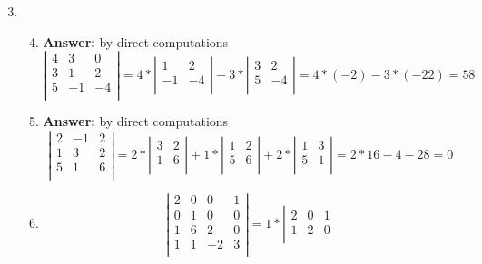 \documentclass[8pt]{article} %
\begin{document}
\begin{enumerate}[1]
	\setcounter{enumi}{2}
	\item \begin{enumerate}[\bf(a)]
	\setcounter{enumi}{3}
\item {\bf Answer: }by direct computations
\[\left|\begin{array}{rrr}
4&3&0\\
3&1&2\\
5&-1&-4\\
\end{array}\right|=
4*\left|\begin{array}{rr}
1&2\\
-1&-4\\
\end{array}\right|-3*
\left|\begin{array}{rr}
3&2\\
5&-4\\
\end{array}\right|=4*(-2)-3*(-22)=58
\]
	\setcounter{enumi}{5}
\item {\bf Answer: }by direct computations
\[\left|\begin{array}{rrr}
2&-1&2\\
1&3&2\\
5&1&6\\
\end{array}\right|=
2*
\left|\begin{array}{rr}
3&2\\
1&6\\
\end{array}\right|+1*
\left|\begin{array}{rr}
1&2\\
5&6\\
\end{array}\right|
+2*
\left|\begin{array}{rr}
1&3\\
5&1\\
\end{array}\right|=2*16-4-28=0\]
\item
	\[
\left|\begin{array}{rrrr}
2&0&0&1\\
0&1&0&0\\
1&6&2&0\\
1&1&-2&3\\
\end{array}\right|=1*
\left|\begin{array}{rrr}
2&0&1\\
1&2&0\\

\end{array}\]
\end{enumerate}
\end{enumerate}
\end{document}
